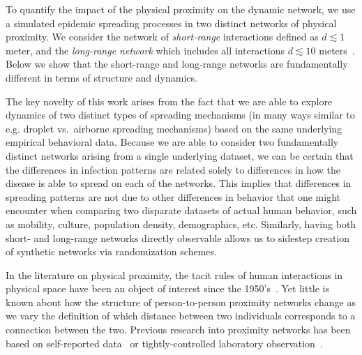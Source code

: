 \documentclass[fleqn,10pt]{wlscirep}
\begin{document}
To quantify the impact of the physical proximity on the dynamic network, we use a simulated epidemic spreading processes in two distinct networks of physical proximity.	
We consider the network of \emph{short-range} interactions defined as $d \apprle 1$ meter, and the \emph{long-range network} which includes all interactions $d \apprle 10$ meters~\cite{sekara2014strength}.
Below we show that the short-range and long-range networks are fundamentally different in terms of structure and dynamics.

The key novelty of this work arises from the fact that we are able to explore dynamics of two distinct types of spreading mechanisms (in many ways similar to e.g. droplet vs.~airborne spreading mechanisms) based on the same underlying empirical behavioral data. 
Because we are able to consider two fundamentally distinct networks arising from a single underlying dataset, we can be certain that the differences in infection patterns are related solely to differences in how the disease is able to spread on each of the networks. 
This implies that differences in spreading patterns are not due to other differences in behavior that one might encounter when comparing two disparate datasets of actual human behavior, such as mobility, culture, population density, demographics, etc.
Similarly, having both short- and long-range networks directly observable allows us to sidestep creation of synthetic networks via randomization schemes.

In the literature on physical proximity, the tacit rules of human interactions in physical space have been an object of interest since the 1950's~\cite{sommer1959studies, hall1969hidden, eagle2006reality}.
Yet little is known about how the structure of person-to-person proximity networks change as we vary the definition of which distance between two individuals corresponds to a connection between the two.
Previous research into proximity networks has been based on self-reported data~\cite{hall1969hidden, read2008dynamic, mossong2008social} or tightly-controlled laboratory observation~\cite{sommer1959studies}. 
\end{document}
